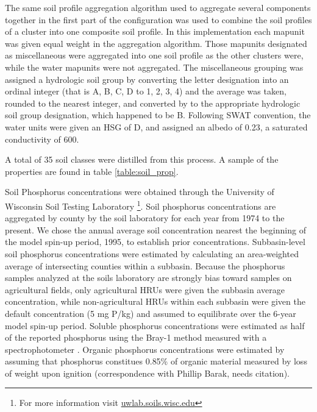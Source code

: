The same soil profile aggregation algorithm \citep{beaudette_algorithms_2013} used to aggregate several components together in the first part of the configuration was used to combine the soil profiles of a cluster into one composite soil profile. In this implementation each mapunit was given equal weight in the aggregation algorithm. Those mapunits designated as miscellaneous were aggregated into one soil profile as the other clusters were, while the water mapunits were not aggregated. The miscellaneous  grouping was assigned a hydrologic soil group by converting the letter designation into an ordinal integer (that is A, B, C, D to 1, 2, 3, 4) and the average was taken, rounded to the nearest integer, and converted by to the appropriate hydrologic soil group designation, which happened to be B. Following SWAT convention, the water units were given an HSG of D, and assigned an albedo of 0.23, a saturated conductivity of 600.

A total of 35 soil classes were distilled from this process. A sample of the properties are found in table \ref{table:soil_prop}.


Soil Phosphorus concentrations were obtained through the University of Wisconsin Soil Testing Laboratory \footnote{For more information visit \href{http://uwlab.soils.wisc.edu/}{uwlab.soils.wisc.edu}}. Soil phosphorus concentrations are aggregated by county by the soil laboratory for each year from 1974 to the present. We chose the annual average soil concentration nearest the beginning of the model spin-up period, 1995, to establish prior concentrations. Subbasin-level soil phosphorus concentrations were estimated by calculating an area-weighted average of intersecting counties within a subbasin. Because the phosphorus samples analyzed at the soils laboratory are strongly bias toward samples on agricultural fields, only agricultural HRUs were given the subbasin average concentration, while non-agricultural HRUs within each subbasin were given the default concentration (5 mg P/kg) and assumed to equilibrate over the 6-year model spin-up period. Soluble phosphorus concentrations were estimated as half of the reported phosphorus using the Bray-1 method measured with a spectrophotometer \citep{vadas_validating_2010}. Organic phosphorus concentrations were estimated by assuming that phosphorus constitues 0.85\% of organic material measured by loss of weight upon ignition (correspondence with Phillip Barak, needs citation).